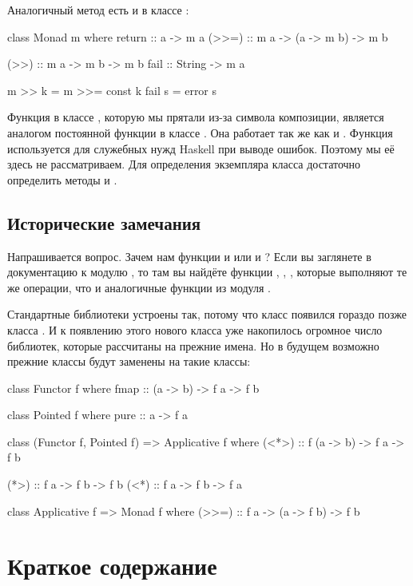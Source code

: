 Аналогичный метод есть и в классе :

\begin{code}
class  Monad m  where
    return  :: a -> m a
    (>>=)   :: m a -> (a -> m b) -> m b
    
    (>>)    :: m a -> m b -> m b
    fail    :: String -> m a

    m >> k  = m >>= const k
    fail s  = error s
\end{code}

Функция \In{>>} в классе , которую
мы прятали из-за символа композиции, является 
аналогом постоянной функции в классе .
Она работает так же как и \In{*>}. 
Функция  используется для служебных нужд Haskell при выводе
ошибок. Поэтому мы её здесь не рассматриваем. Для определения 
экземпляра класса  достаточно определить методы
 и \In{>>=}.

\subsection{Исторические замечания}

Напрашивается вопрос.
Зачем нам функции  и  или \In{*>} и \In{>>}?
Если вы заглянете в документацию к модулю ,
то там вы найдёте функции , , ,
которые выполняют те же операции, что и аналогичные функции
из модуля .

Стандартные библиотеки устроены так, потому что класс 
 появился гораздо позже класса . 
И к появлению этого нового класса уже накопилось огромное 
число библиотек, которые рассчитаны на прежние имена. 
Но в будущем возможно прежние классы будут заменены на такие классы:

\begin{code}
class Functor f where
    fmap :: (a -> b) -> f a -> f b

class Pointed f where
    pure :: a -> f a

class (Functor f, Pointed f) => Applicative f where
    (<*>) :: f (a -> b) -> f a -> f b

    (*>)  :: f a -> f b -> f b
    (<*)  :: f a -> f b -> f a

class Applicative f => Monad f where
    (>>=) :: f a -> (a -> f b) -> f b
\end{code}


\section{Краткое содержание}

